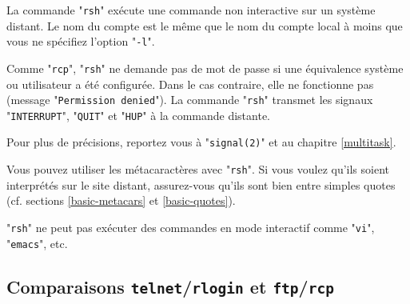 La commande "{\tt rsh}" ex{\'e}cute une commande non interactive sur un
syst{\`e}me distant. Le nom du compte est le m{\^e}me que le nom du compte local
{\`a} moins que vous ne sp{\'e}cifiez l'option "{\tt -l}".

Comme "{\tt rcp}", "{\tt rsh}" ne demande pas de mot de passe si une
{\'e}quivalence syst{\`e}me ou utilisateur a {\'e}t{\'e} configur{\'e}e. Dans le cas
contraire, elle ne fonctionne pas (message "{\tt Permission denied}").
La commande "{\tt rsh}" transmet les signaux "{\tt INTERRUPT}",
"{\tt QUIT}" et "{\tt HUP}" {\`a} la commande distante.

Pour plus de pr{\'e}cisions, reportez vous {\`a} "{\tt signal(2)}" et au chapitre
\ref{multitask}.

Vous pouvez utiliser les m{\'e}tacaract{\`e}res avec "{\tt rsh}". Si vous voulez qu'ils
soient interpr{\'e}t{\'e}s sur le site distant, assurez-vous qu'ils sont bien
entre simples quotes (cf. sections \ref{basic-metacars} et \ref{basic-quotes}).

\begin{remarque}
"{\tt rsh}" ne peut pas ex{\'e}cuter des commandes en mode interactif comme
"{\tt vi}", "{\tt emacs}", etc.
\end{remarque}

\subsection{Comparaisons \texttt{telnet}/\texttt{rlogin} et \texttt{ftp}/\texttt{rcp}}

